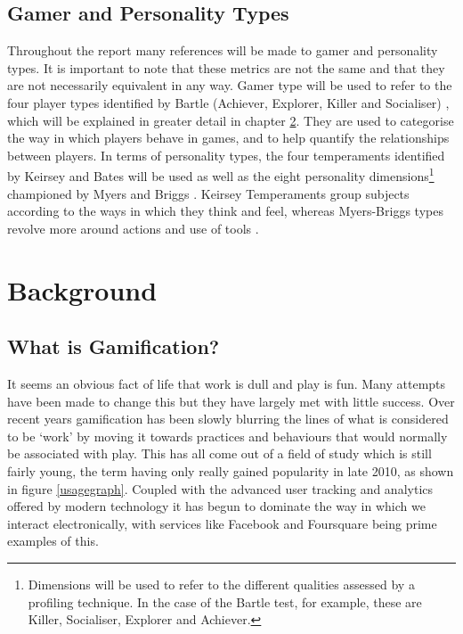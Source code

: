 \documentclass[12pt,a4paper,twoside]{report}
\begin{document}
\section{Gamer and Personality Types}
Throughout the report many references will be made to gamer and personality types. It is important to note that these metrics are not the same and that they are not necessarily equivalent in any way. Gamer type will be used to refer to the four player types identified by Bartle (Achiever, Explorer, Killer and Socialiser) \cite{bartle1996hearts}, which will be explained in greater detail in chapter \ref{sec:background}. They are used to categorise the way in which players behave in games, and to help quantify the relationships between players. In terms of personality types, the four temperaments identified by Keirsey and Bates \cite{keirsey1998please} \cite{keirsey1984} will be used as well as the eight personality dimensions\footnote{Dimensions will be used to refer to the different qualities assessed by a profiling technique. In the case of the Bartle test, for example, these are Killer, Socialiser, Explorer and Achiever.} championed by Myers and Briggs \cite{myers1995gifts}. Keirsey Temperaments group subjects according to the ways in which they think and feel, whereas Myers-Briggs types revolve more around actions and use of tools \cite{keirsey1984}.

\chapter{Background}
\label{sec:background}
\section{What is Gamification?}
It seems an obvious fact of life that work is dull and play is fun. Many attempts have been made to change this but they have largely met with little success. Over recent years gamification has been slowly blurring the lines of what is considered to be `work' by moving it towards practices and behaviours that would normally be associated with play. This has all come out of a field of study which is still fairly young, the term having only really gained popularity in late 2010, as shown in figure \ref{usagegraph}. Coupled with the advanced user tracking and analytics offered by modern technology it has begun to dominate the way in which we interact electronically, with services like Facebook and Foursquare being prime examples of this.
\end{document}
